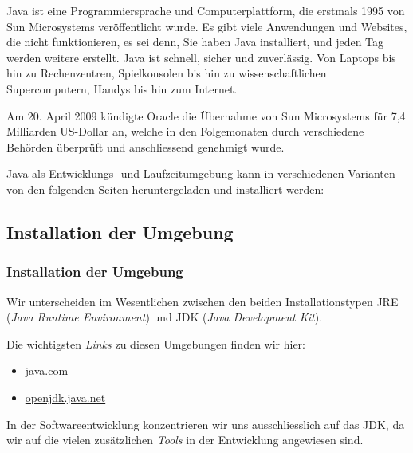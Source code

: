 Java ist eine Programmiersprache und Computerplattform, die erstmals 1995 von
Sun Microsystems veröffentlicht wurde. Es gibt viele Anwendungen und
Websites, die nicht funktionieren, es sei denn, Sie haben Java installiert,
und jeden Tag werden weitere erstellt. Java ist schnell, sicher und
zuverlässig. Von Laptops bis hin zu Rechenzentren, Spielkonsolen bis hin zu
wissenschaftlichen Supercomputern, Handys bis hin zum Internet.

Am 20. April 2009 kündigte Oracle die Übernahme von Sun Microsystems für
7,4 Milliarden US-Dollar an, welche in den Folgemonaten durch verschiedene
Behörden überprüft und anschliessend genehmigt wurde.

Java als Entwicklungs- und Laufzeitumgebung kann in verschiedenen Varianten
von den folgenden Seiten heruntergeladen und installiert werden:


\subsection{Installation der Umgebung}
\label{subsec:installation}

\begin{frame}[fragile]
    \frametitle<presentation>{Installation der Umgebung}

    Wir unterscheiden im Wesentlichen zwischen den beiden Installationstypen
    JRE ({\em Java Runtime Environment}) und JDK ({\em Java
    Development Kit}).

    Die wichtigsten {\em Links} zu diesen Umgebungen finden wir hier:

    \begin{itemize}
        \item \href{https://java.com}{java.com}
        \item \href{https://openjdk.java.net}{openjdk.java.net}
    \end{itemize}

\end{frame}

In der Softwareentwicklung konzentrieren wir uns ausschliesslich auf das JDK,
da wir auf die vielen zusätzlichen {\em Tools} in der Entwicklung angewiesen
sind.


